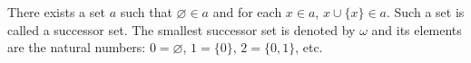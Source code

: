 There exists a set $a$ such that $\varnothing \in a$ and for each $x \in a$, $x \cup \{x\} \in a$. Such a set is called a successor set. The smallest successor set is denoted by $\omega$ and its elements are the natural numbers: $0 = \varnothing$, $1 = \{0\}$, $2 = \{0,1\}$, etc.
